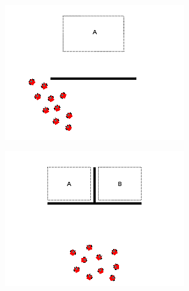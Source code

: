 \begin{minipage}{\linewidth}
	\centering
	\begin{minipage}{0.42\linewidth}
		\includegraphics[width=\linewidth]{../ui_experiment/slide_images/Swarm_Robot_Control_-_10_Robot_0007.png}
		\label{fig:sub1}
	\end{minipage}
	\begin{minipage}{0.42\linewidth}
		\includegraphics[width=\linewidth]{../ui_experiment/slide_images/Swarm_Robot_Control_-_10_Robot_0009.png}
		\label{fig:sub2}
	\end{minipage}
\end{minipage}

